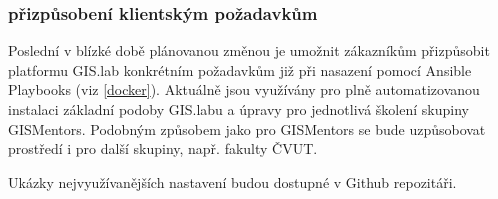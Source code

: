 \subsubsection{přizpůsobení klientským požadavkům}
Poslední v blízké době plánovanou změnou je umožnit zákazníkům
přizpůsobit platformu GIS.lab konkrétním požadavkům již při nasazení
pomocí Ansible Playbooks (viz \ref{docker}). Aktuálně jsou využívány
pro plně automatizovanou instalaci základní podoby GIS.labu a úpravy
pro jednotlivá školení skupiny GISMentors. Podobným způsobem jako pro
GISMentors se bude uzpůsobovat prostředí i pro další skupiny,
např. fakulty ČVUT.

Ukázky nejvyužívanějších nastavení budou dostupné v Github
repozitáři.

